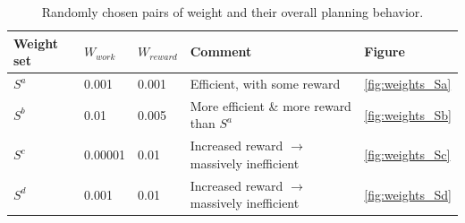 \documentclass{tamuccthesis}
\begin{document}
\begin{table}[H]
    \centering
    \begin{tabular}{|l|l|l|l|l|}
        \hline
        Weight set & $W_{work}$ & $W_{reward}$ & Comment & Figure \\
        \hline
        $S^a$ & 0.001 & 0.001 & Efficient, with some reward & \ref{fig:weights_Sa} \\
        \hline
        $S^b$ & 0.01 & 0.005 & More efficient \& more reward than $S^a$ & \ref{fig:weights_Sb} \\
        \hline
        $S^c$ & 0.00001 & 0.01 & Increased reward $\rightarrow$ massively inefficient & \ref{fig:weights_Sc} \\
        \hline
        $S^d$ & 0.001 & 0.01 & Increased reward $\rightarrow$ massively inefficient & \ref{fig:weights_Sd} \\
        \hline
    \end{tabular}
    \caption{Randomly chosen pairs of weight and their overall planning behavior.}
    \label{tbl:weight_sets}
\end{table}
\end{document}
